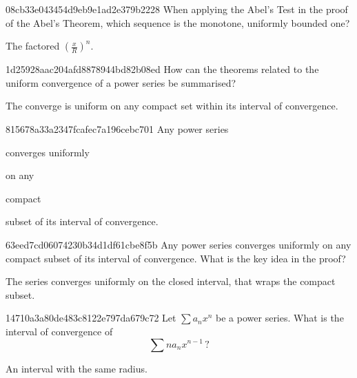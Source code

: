 \begin{note}{08cb33e043454d9eb9e1ad2e379b2228}
    When applying the Abel's Test in the proof of the Abel's Theorem, which sequence is the monotone, uniformly bounded one?

    \begin{cloze}{1}
        The factored \({ \left( \frac{x}{R} \right)^{n} }\).
    \end{cloze}
\end{note}

\begin{note}{1d25928aac204afd8878944bd82b08ed}
    How can the theorems related to the uniform convergence of a power series be summarised?

    \begin{cloze}{1}
        The converge is uniform on any compact set within its interval of convergence.
    \end{cloze}
\end{note}

\begin{note}{815678a33a2347fcafec7a196cebc701}
    Any power series \begin{icloze}{1}converges uniformly\end{icloze} on any \begin{icloze}{2}compact\end{icloze} subset of its interval of convergence.
\end{note}

\begin{note}{63eed7cd06074230b34d1df61cbe8f5b}
    Any power series converges uniformly on any compact subset of its interval of convergence.
    What is the key idea in the proof?

    \begin{cloze}{1}
        The series converges uniformly on the closed interval, that wraps the compact subset.
    \end{cloze}
\end{note}

\begin{note}{14710a3a80de483c8122e797da679c72}
    Let \({ \sum a_n x^{n} }\) be a power series.
    What is the interval of convergence of
    \[
        \sum n a_n x^{n-1}\,?
    \]

    \begin{cloze}{1}
        An interval with the same radius.
    \end{cloze}
\end{note}

